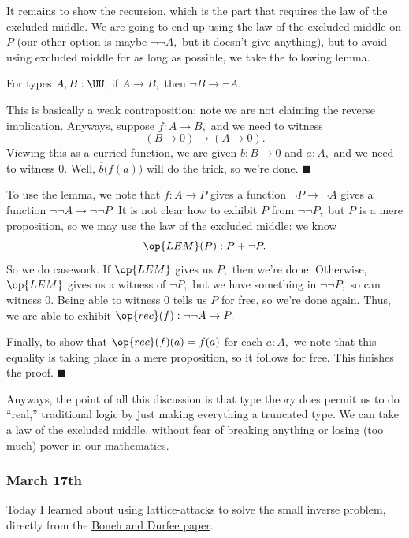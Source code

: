 It remains to show the recursion, which is the part that requires the law of the excluded middle. We are going to end up using the law of the excluded middle on $P$ (our other option is maybe $\lnot\lnot A,$ but it doesn't give anything), but to avoid using excluded middle for as long as possible, we take the following lemma.
\begin{lemma}
    For types $A,B:\UU,$ if $A\to B,$ then $\lnot B\to\lnot A.$
\end{lemma}
This is basically a weak contraposition; note we are not claiming the reverse implication. Anyways, suppose $f:A\to B,$ and we need to witness
\[(B\to0)\to(A\to0).\]
Viewing this as a curried function, we are given $\overline b:B\to0$ and $a:A,$ and we need to witness $0.$ Well, $\overline b\big(f(a)\big)$ will do the trick, so we're done. $\blacksquare$

To use the lemma, we note that $f:A\to P$ gives a function $\lnot P\to\lnot A$ gives a function $\lnot\lnot A\to\lnot\lnot P.$ It is not clear how to exhibit $P$ from $\lnot\lnot P,$ but $P$ is a mere proposition, so we may use the law of the excluded middle: we know
\[\op{LEM}(P):P+\lnot P.\]
So we do casework. If $\op{LEM}$ gives us $P,$ then we're done. Otherwise, $\op{LEM}$ gives us a witness of $\lnot P,$ but we have something in $\lnot\lnot P,$ so can witness $0.$ Being able to witness $0$ tells us $P$ for free, so we're done again. Thus, we are able to exhibit $\op{rec}(f):\lnot\lnot A\to P.$

Finally, to show that $\op{rec}(f)(a)=f(a)$ for each $a:A,$ we note that this equality is taking place in a mere proposition, so it follows for free. This finishes the proof. $\blacksquare$

Anyways, the point of all this discussion is that type theory does permit us to do ``real,'' traditional logic by just making everything a truncated type. We can take a law of the excluded middle, without fear of breaking anything or losing (too much) power in our mathematics.

\subsubsection{March 17th}
Today I learned about using lattice-attacks to solve the small inverse problem, directly from the \href{https://web.archive.org/web/20210614021727/https://citeseerx.ist.psu.edu/viewdoc/download?doi=10.1.1.40.2636&rep=rep1&type=pdf}{Boneh and Durfee paper}. \todo{}

